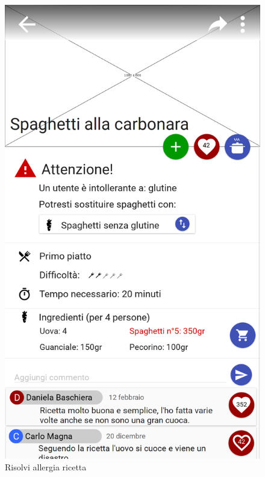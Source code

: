 \begin{figure}[H]
	
	\begin{minipage}{.49\textwidth}
		\includegraphics[width=\textwidth]{img/wireframe/presentazione_ricetta_allergia_cambio_ingrediente_aggiungi_ricetta.png}
		\caption{Risolvi allergia ricetta}
	\end{minipage}
	\hfill
	\begin{minipage}{.49\textwidth}

\end{minipage}
\end{figure}
